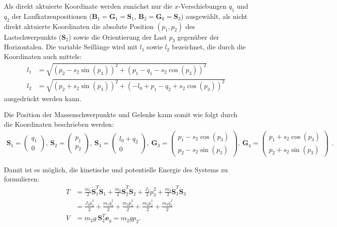 Als direkt aktuierte Koordinate werden zunächst nur die $x$-Verschiebungen $q_1$ und $q_2$ der Laufkatzenpositionen ($\mathbf{B}_1 = \mathbf{G}_1 = \mathbf{S}_1$, $\mathbf{B}_2 = \mathbf{G}_6 = \mathbf{S}_3$) ausgewählt, als nicht direkt aktuierte Koordinaten die absolute Position $(p_1, p_2)$ des Lastschwerpunkts ($\mathbf{S}_2$) sowie die Orientierung der Last $p_3$ gegenüber der Horizontalen. Die variable Seillänge wird mit $l_1$ sowie $l_2$ bezeichnet, die durch die Koordinaten auch mittels:
\begin{align}
	l_1 &= \sqrt{\left(p_{2} - s_{2} \sin{\left(p_{3} \right)}\right)^{2} + \left(p_{1} - q_{1} - s_{2} \cos{\left(p_{3} \right)}\right)^{2}} \\
	l_2 &= \sqrt{\left(p_{2} + s_{2} \sin{\left(p_{3} \right)}\right)^{2} + \left(- l_{0} + p_{1} - q_{2} + s_{2} \cos{\left(p_{3} \right)}\right)^{2}}
\end{align}
ausgedrückt werden kann.

Die Position der Massenschwerpunkte und Gelenke kann somit wie folgt durch die Koordinaten beschrieben werden:
\begin{equation}
	\begin{smallmatrix}
		\mathbf{S}_1 =
		\begin{pmatrix}
			q_1 \\
			0
		\end{pmatrix}, 
		\
		\mathbf{S}_2 =
		\begin{pmatrix}
			p_1 \\
			p_2
		\end{pmatrix},
		\
		\mathbf{S}_3 =
		\begin{pmatrix}
			l_0 + q_2 \\
			0
		\end{pmatrix},
		\
		\mathbf{G}_3 =
		\left(\begin{matrix}
			p_{1} - s_{2} \cos{\left(p_{3} \right)}\\
			p_{2} - s_{2} \sin{\left(p_{3} \right)}
		\end{matrix}\right),
		\
		\mathbf{G}_4 =
		\left(\begin{matrix}
			p_{1} + s_{2} \cos{\left(p_{3} \right)}\\
			p_{2} + s_{2} \sin{\left(p_{3} \right)}
		\end{matrix}\right)
	\end{smallmatrix}.
\end{equation}

Damit ist es möglich, die kinetische und potentielle Energie des Systems zu formulieren:
\begin{align}
	T &= \frac{m_1}{2} \dot{\mathbf{S}}_1^T \dot{\mathbf{S}}_1 + \frac{m_2}{2} \dot{\mathbf{S}}_2^T \dot{\mathbf{S}}_2 + \frac{J_2}{2} \dot{p}_3^2 + \frac{m_3}{2} \dot{\mathbf{S}}_3^T \dot{\mathbf{S}}_3 \nonumber \\  
	&= \frac{J_{2} \dot{p}_{3}^{2}}{2} + \frac{m_{1} \dot{q}_{1}^{2}}{2} + \frac{m_{2} \dot{p}_{1}^{2}}{2} + \frac{m_{2} \dot{p}_{2}^{2}}{2} + \frac{m_{3} \dot{q}_{2}^{2}}{2} \\
	V &= m_2 g \ \mathbf{S}_2^T \mathbf{e}_y = m_{2} g p_{2}.
\end{align}

